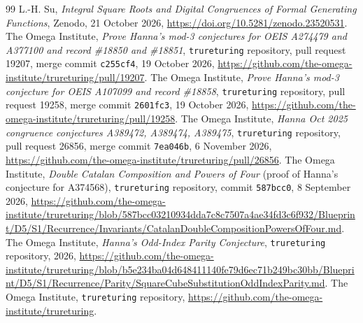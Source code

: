 \documentclass[11pt]{article}
\theoremstyle{remark}
\begin{document}
\begin{thebibliography}{99}
L.-H. Su, \emph{Integral Square Roots and Digital Congruences of Formal
Generating Functions}, Zenodo, 21 October 2026,
\url{https://doi.org/10.5281/zenodo.23520531}.
The Omega Institute, \emph{Prove Hanna's mod-3 conjectures for OEIS A274479 and
A377100 and record \#18850 and \#18851}, \texttt{trureturing} repository, pull request 19207, merge commit
\texttt{c255cf4}, 19 October 2026,
\url{https://github.com/the-omega-institute/trureturing/pull/19207}.
The Omega Institute, \emph{Prove Hanna's mod-3 conjecture for OEIS A107099 and record \#18858},
\texttt{trureturing} repository, pull request 19258, merge commit
\texttt{2601fc3}, 19 October 2026,
\url{https://github.com/the-omega-institute/trureturing/pull/19258}.
The Omega Institute, \emph{Hanna Oct 2025 congruence conjectures A389472, A389474,
A389475}, \texttt{trureturing} repository, pull request 26856, merge commit
\texttt{7ea046b}, 6 November 2026,
\url{https://github.com/the-omega-institute/trureturing/pull/26856}.
The Omega Institute, \emph{Double Catalan Composition and Powers of Four}
(proof of Hanna's conjecture for A374568), \texttt{trureturing} repository,
commit \texttt{587bcc0}, 8 September 2026,
\url{https://github.com/the-omega-institute/trureturing/blob/587bcc03210934dda7c8c7507a4ae34fd3c6f932/Blueprint/D5/S1/Recurrence/Invariants/CatalanDoubleCompositionPowersOfFour.md}.
The Omega Institute, \emph{Hanna's Odd-Index Parity Conjecture},
\texttt{trureturing} repository, 2026,
\url{https://github.com/the-omega-institute/trureturing/blob/b5e234ba04d648411140fe79d6ec71b249bc30bb/Blueprint/D5/S1/Recurrence/Parity/SquareCubeSubstitutionOddIndexParity.md}.
The Omega Institute, \texttt{trureturing} repository,
\url{https://github.com/the-omega-institute/trureturing}.
\end{thebibliography}
\end{document}
